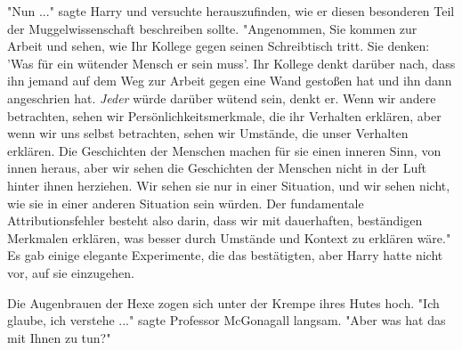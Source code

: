 "Nun ..." sagte Harry und versuchte herauszufinden, wie er diesen besonderen Teil der Muggelwissenschaft beschreiben sollte. "Angenommen, Sie kommen zur Arbeit und sehen, wie Ihr Kollege gegen seinen Schreibtisch tritt. Sie denken: 'Was für ein wütender Mensch er sein muss'. Ihr Kollege denkt darüber nach, dass ihn jemand auf dem Weg zur Arbeit gegen eine Wand gestoßen hat und ihn dann angeschrien hat. \emph{Jeder} würde darüber wütend sein, denkt er. Wenn wir andere betrachten, sehen wir Persönlichkeitsmerkmale, die ihr Verhalten erklären, aber wenn wir uns selbst betrachten, sehen wir Umstände, die unser Verhalten erklären. Die Geschichten der Menschen machen für sie einen inneren Sinn, von innen heraus, aber wir sehen die Geschichten der Menschen nicht in der Luft hinter ihnen herziehen. Wir sehen sie nur in einer Situation, und wir sehen nicht, wie sie in einer anderen Situation sein würden. Der fundamentale Attributionsfehler besteht also darin, dass wir mit dauerhaften, beständigen Merkmalen erklären, was besser durch Umstände und Kontext zu erklären wäre." Es gab einige elegante Experimente, die das bestätigten, aber Harry hatte nicht vor, auf sie einzugehen. 


Die Augenbrauen der Hexe zogen sich unter der Krempe ihres Hutes hoch. "Ich glaube, ich verstehe ..." sagte Professor McGonagall langsam. "Aber was hat das mit Ihnen zu tun?" 

